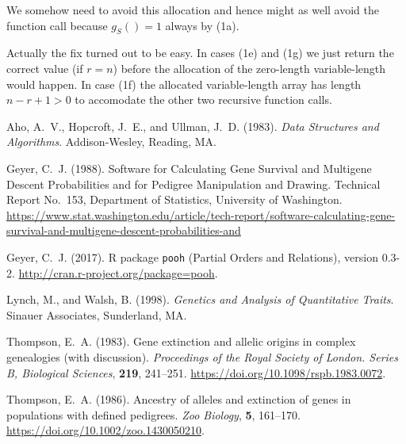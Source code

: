 \documentclass[11pt]{article}
\begin{document}
We somehow need to avoid this allocation and hence might as well avoid
the function call because $g_S() = 1$ always by (1a).

Actually the fix turned out to be easy.  In cases (1e) and (1g) we just
return the correct value (if $r = n$) before the allocation of the zero-length
variable-length would happen.  In case (1f) the allocated variable-length
array has length $n - r + 1 > 0$ to accomodate the other two recursive function
calls.

\begin{thebibliography}{}

Aho, A.~V., Hopcroft, J.~E., and Ullman, J.~D. (1983).
\newblock \emph{Data Structures and Algorithms}.
\newblock Addison-Wesley, Reading, MA.

Geyer, C.~J. (1988).
\newblock Software for Calculating Gene Survival and Multigene Descent
    Probabilities and for Pedigree Manipulation and Drawing.
\newblock Technical Report No.~153, Department of Statistics,
    University of Washington.
\newblock \url{https://www.stat.washington.edu/article/tech-report/software-calculating-gene-survival-and-multigene-descent-probabilities-and}

Geyer, C.~J. (2017).
\newblock R package \texttt{pooh} (Partial Orders and Relations), version 0.3-2.
\newblock \url{http://cran.r-project.org/package=pooh}.

Lynch, M., and Walsh, B. (1998).
\newblock \emph{Genetics and Analysis of Quantitative Traits}.
\newblock Sinauer Associates, Sunderland, MA.

Thompson, E.~A. (1983).
\newblock Gene extinction and allelic origins in complex genealogies
    (with discussion).
\newblock \emph{Proceedings of the Royal Society of London. Series B,
    Biological Sciences}, \textbf{219}, 241--251.
\newblock \url{https://doi.org/10.1098/rspb.1983.0072}.

Thompson, E.~A. (1986).
\newblock Ancestry of alleles and extinction of genes in populations with
    defined pedigrees.
\newblock \emph{Zoo Biology}, \textbf{5}, 161--170.
\newblock \url{https://doi.org/10.1002/zoo.1430050210}.

\end{thebibliography}
\end{document}
